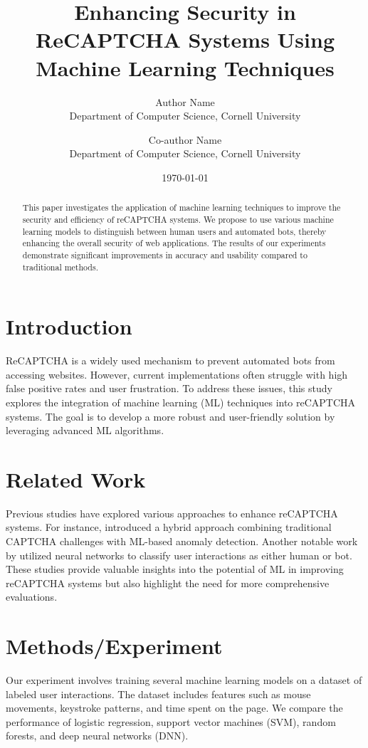 \documentclass{article}
\title{Enhancing Security in ReCAPTCHA Systems Using Machine Learning Techniques}
\author{Author Name \\
Department of Computer Science, Cornell University \\
\and Co-author Name \\
Department of Computer Science, Cornell University}
\date{\today}
\begin{document}
\maketitle

\begin{abstract}
This paper investigates the application of machine learning techniques to improve the security and efficiency of reCAPTCHA systems. We propose to use various machine learning models to distinguish between human users and automated bots, thereby enhancing the overall security of web applications. The results of our experiments demonstrate significant improvements in accuracy and usability compared to traditional methods.
\end{abstract}

\section{Introduction}
\label{sec:intro}
ReCAPTCHA is a widely used mechanism to prevent automated bots from accessing websites. However, current implementations often struggle with high false positive rates and user frustration. To address these issues, this study explores the integration of machine learning (ML) techniques into reCAPTCHA systems. The goal is to develop a more robust and user-friendly solution by leveraging advanced ML algorithms.

\section{Related Work}
\label{sec:related_work}
Previous studies have explored various approaches to enhance reCAPTCHA systems. For instance, \citet{ref1} introduced a hybrid approach combining traditional CAPTCHA challenges with ML-based anomaly detection. Another notable work by \citet{ref2} utilized neural networks to classify user interactions as either human or bot. These studies provide valuable insights into the potential of ML in improving reCAPTCHA systems but also highlight the need for more comprehensive evaluations.

\section{Methods/Experiment}
\label{sec:methods}
Our experiment involves training several machine learning models on a dataset of labeled user interactions. The dataset includes features such as mouse movements, keystroke patterns, and time spent on the page. We compare the performance of logistic regression, support vector machines (SVM), random forests, and deep neural networks (DNN).
\end{document}

